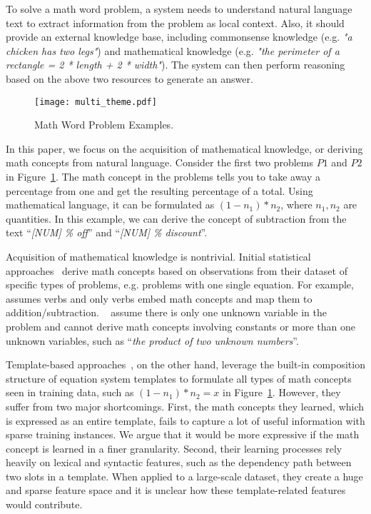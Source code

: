 \documentclass[11pt,letterpaper]{article}
\begin{document}
To solve a math word problem, a system needs to understand natural language text to extract information from the problem as local context. Also, it should provide an external knowledge base, including commonsense knowledge (e.g. \emph{"a chicken has two legs"}) and mathematical knowledge (e.g. \emph{"the perimeter of a rectangle = 2 * length + 2 * width"}). The system can then perform reasoning based on the above two resources to generate an answer.

\begin{figure}[htb]
    \centering
    \texttt{[image: multi\_theme.pdf]}
    \caption{Math Word Problem Examples.}\label{fig:theme}
\end{figure}

In this paper, we focus on the acquisition of mathematical knowledge, or deriving math concepts from natural language. Consider the first two problems $P1$ and $P2$ in Figure~\ref{fig:theme}. The math concept in the problems tells you to take away a percentage from one and get the resulting percentage of a total. Using mathematical language, it can be formulated as $(1-n_1)*n_2$, where $n_1, n_2$ are quantities. In this example, we can derive the concept of subtraction from the text ``\emph{[NUM] \% off}'' and ``\emph{[NUM] \% discount}''.

Acquisition of mathematical knowledge is nontrivial. Initial statistical approaches~\cite{hosseini2014verb,subhro2015tree,rik2015alges} derive math concepts based on observations from their dataset of specific types of problems, e.g. problems with one single equation. For example, ~ assumes verbs and only verbs embed math concepts and map them to addition/subtraction. ~ assume there is only one unknown variable in the problem and cannot derive math concepts involving constants or more than one unknown variables, such as ``\emph{the product of two unknown numbers}''.

Template-based approaches~\cite{kushman2014mit,lipu2015baidu,upadhyay2016implicit}, on the other hand, leverage the built-in composition structure of equation system templates to formulate all types of math concepts seen in training data, such as $(1-n_1)*n_2=x$ in Figure~\ref{fig:theme}. However, they suffer from two major shortcomings. First, the math concepts they learned, which is expressed as an entire template, fails to capture a lot of useful information with sparse training instances. We argue that it would be more expressive if the math concept is learned in a finer granularity. Second, their learning processes rely heavily on lexical and syntactic features, such as the dependency path between two slots in a template. When applied to a large-scale dataset, they create a huge and sparse feature space and it is unclear how these template-related features would contribute.
\end{document}
